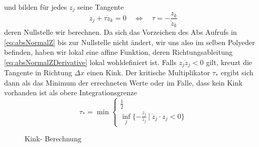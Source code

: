 und bilden für jedes $z_j$ seine Tangente
\[
 z_j + \tau \dot z_k = 0 \quad \iff \quad \tau =- \frac{z_k}{\dot z_k}
\]
deren Nullstelle wir berechnen. Da sich das Vorzeichen des Abs Aufrufs in \eqref{eq:absNormalZ} bis zur Nullstelle nicht ändert, wir uns also im selben Polyeder befinden, haben wir lokal eine affine Funktion, deren Richtungsableitung \eqref{eq:absNormalZDerivative} lokal wohldefiniert ist.
Falls $z_j\dot z_j <0$ gilt, kreuzt die Tangente in Richtung $\Delta x$ einen Kink.
Der kritische Multiplikator $\tau_*$ ergibt sich dann als das Minimum der errechneten Werte oder im Falle, dass kein Kink vorhanden ist als obere Integrationsgrenze
\[
 \tau_* = \min \begin{cases}
		\frac{1}{2}\\
		\inf_j\lbrace -\frac{z_j}{\dot z_j}~ \vert ~ \dot z_j \cdot z_j <0 \rbrace
	       \end{cases}
\]

\begin{figure}[H]
\centering
 
 \caption{Kink- Berechnung}
\label{fig:findingKinks} 
\end{figure}

